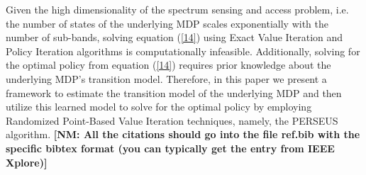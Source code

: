 \documentclass[10pt,twocolumn]{IEEEtran}
\newcommand{\nm}[1]{{\color{blue}\bf{[NM: #1]}}}
\begin{document}
Given the high dimensionality of the spectrum sensing and access problem, i.e. the number of states of the underlying MDP scales exponentially with the number of sub-bands, solving equation (\ref{14}) using Exact Value Iteration and Policy Iteration algorithms is computationally infeasible. Additionally, solving for the optimal policy from equation (\ref{14}) requires prior knowledge about the underlying MDP's transition model. Therefore, in this paper we present a framework to estimate the transition model of the underlying MDP and then utilize this learned model to solve for the optimal policy by employing Randomized Point-Based Value Iteration techniques, namely, the PERSEUS algorithm.
\nm{All the citations should go into the file ref.bib with the specific bibtex format (you can typically get the entry from IEEE Xplore)}

 
\end{document}
